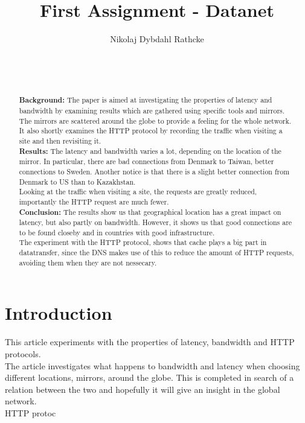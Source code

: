 \documentclass{acm_proc_article-sp}
\begin{document}
\title{First Assignment - Datanet}

\author{
\alignauthor
Nikolaj Dybdahl Rathcke\\
       \\
       \\
       \\
}

\maketitle
\begin{abstract}
\textbf{Background:} The paper is aimed at investigating the properties of latency and bandwidth by examining results which are gathered using specific tools and mirrors. The mirrors are scattered around the globe to provide a feeling for the whole network.\\
It also shortly examines the HTTP protocol by recording the traffic when visiting a site and then revisiting it.\\
\textbf{Results:} The latency and bandwidth varies a lot, depending on the location of the mirror. In particular, there are bad connections from Denmark to Taiwan, better connections to Sweden. Another notice is that there is a slight better connection from Denmark to US than to Kazakhstan.\\
Looking at the traffic when visiting a site, the requests are greatly reduced, importantly the HTTP request are much fewer.\\
\textbf{Conclusion:} The results show us that geographical location has a great impact on latency, but also partly on bandwidth. However, it shows us that good connections are to be found closeby and in countries with good infrastructure.\\
The experiment with the HTTP protocol, shows that cache plays a big part in datatransfer, since the DNS makes use of this to reduce the amount of HTTP requests, avoiding them when they are not nessecary.

\end{abstract}

\section{Introduction}
This article experiments with the properties of latency, bandwidth and HTTP protocols.\\
The article investigates what happens to bandwidth and latency when choosing different locations, mirrors, around the globe. This is completed in search of a relation between the two and hopefully it will give an insight in the global network.\\
HTTP protoc
\end{document}
